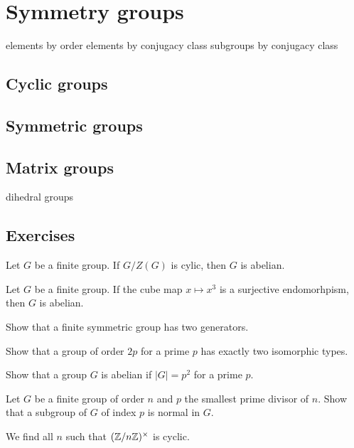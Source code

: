 \documentclass{../note}
\begin{document}
\chapter{Symmetry groups}

elements by order
elements by conjugacy class
subgroups by conjugacy class


\section{Cyclic groups}
\section{Symmetric groups}
\section{Matrix groups}
dihedral groups


\section*{Exercises}

\begin{prb}
Let $G$ be a finite group.
If $G/Z(G)$ is cylic, then $G$ is abelian.
\end{prb}

\begin{prb}
Let $G$ be a finite group.
If the cube map $x\mapsto x^3$ is a surjective endomorhpism, then $G$ is abelian.
\end{prb}

\begin{prb}
Show that a finite symmetric group has two generators.
\end{prb}

\begin{prb}
Show that a group of order $2p$ for a prime $p$ has exactly two isomorphic types.
\end{prb}

\begin{prb}
Show that a group $G$ is abelian if $|G|=p^2$ for a prime $p$.
\end{prb}

\begin{prb}
Let $G$ be a finite group of order $n$ and $p$ the smallest prime divisor of $n$.
Show that a subgroup of $G$ of index $p$ is normal in $G$.
\end{prb}

\begin{prb}
We find all $n$ such that $(\mathbb{Z}/n\mathbb{Z})^\times$ is cyclic.
\end{prb}
\end{document}

